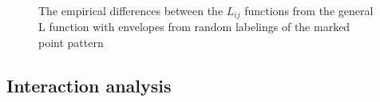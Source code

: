 \documentclass[12pt,a4paper,oneside,article]{memoir}
\begin{document}
\begin{figure}[htbp]
  \begin{adjustwidth}{-2in}{-2in}
	  \centering
  \end{adjustwidth}
  \caption{The empirical differences between the $L_{ij}$ functions from the general L function with envelopes from
  random labelings of the marked point pattern}
  \label{fig:rl}
\end{figure}

\subsection{Interaction analysis}
\end{document}
